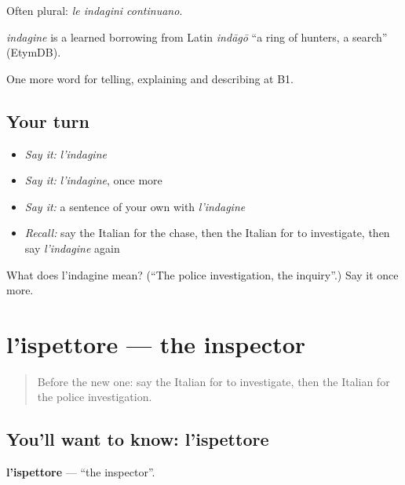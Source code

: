 Often plural: \emph{le indagini continuano}.

\begin{cousinweb}
\emph{indagine} is a learned borrowing from Latin \emph{indāgō} \textquotedblleft{}a ring of hunters, a search\textquotedblright{} (EtymDB).
\end{cousinweb}

\begin{grammarlens}[title={What you've built}]
One more word for telling, explaining and describing at B1.
\end{grammarlens}

\subsection*{Your turn}
\begin{itemize}
\raggedright
  \item \emph{Say it:} \emph{l'indagine}
  \item \emph{Say it:} \emph{l'indagine}, once more
  \item \emph{Say it:} a sentence of your own with \emph{l'indagine}
  \item \emph{Recall:} say the Italian for the chase, then the Italian for to investigate, then say \emph{l'indagine} again
\end{itemize}

\begin{tcolorbox}[breakable,colback=teal!4,colframe=teal!35!black,title={Before you move on}]
What does l'indagine mean? (\textquotedblleft{}The police investigation, the inquiry\textquotedblright{}.) Say it once more.
\end{tcolorbox}
\section[l'ispettore]{l'ispettore — the inspector}

\label{lesson:IT-C295-ispettore}



\begin{quote}
Before the new one: say the Italian for to investigate, then the Italian for the police investigation.
\end{quote}

\subsection*{You'll want to know: l'ispettore}
\textbf{l'ispettore} — \textquotedblleft{}the inspector\textquotedblright{}.

